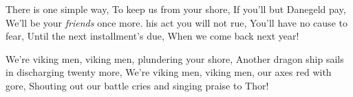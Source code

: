     \beginverse\replay[verse]
        There is one simple way, To keep us from your shore,
        If you'll but Danegeld pay,
        We'll be your \textit{friends} once more.
        his act you will not rue, You'll have no cause to fear,
        Until the next installment's due, When we come back next year!
    \endverse

    \beginchorus\replay[chorus]
        We're viking men, viking men, plundering your shore,
        Another dragon ship sails in discharging twenty more, We're viking men,
        viking men, our axes red with gore,
        Shouting out our battle cries and singing praise to Thor!
    \endchorus
\endsong
